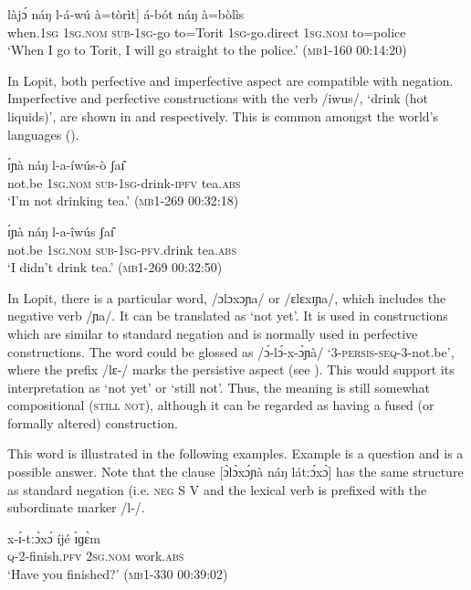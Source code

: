 \documentclass[output=paper,colorlinks,citecolor=brown,draftmode]{langscibook}
\begin{document}
\ea\label{ex:lop:4}
    \gll {\ob}làjɔ́ náŋ l-á-wú à=tòrìt] á-bót náŋ à=bòlìs \\ 
         {\db}when.1\textsc{sg} 1\textsc{sg.nom} \textsc{sub-}1\textsc{sg}{}-go to=Torit 1\textsc{sg}{}-go.direct 1\textsc{sg.nom} to=police \\
    \glt ‘When I go to Torit, I will go straight to the police.’ (\textsc{mb1-160} \textsc{00}:14:20) 
\z 

In Lopit, both perfective and imperfective aspect are compatible with negation. Imperfective and perfective constructions with the verb /iwus/, ‘drink (hot li\-quids)’, are shown in  and  respectively. This is common amongst the world’s languages (\citealt{MiestamoAuwera2011}). 

\ea\label{ex:lop:5}
        \gll ɪ́ɲà náŋ l-a-íwús-ò ʃaɪ̂    \\ 
             not.be 1\textsc{sg.nom} \textsc{sub-1sg}{}-drink-\textsc{ipfv} tea.\textsc{abs}  \\
        \glt ‘I’m not drinking tea.’  (\textsc{mb1-269} \textsc{00}:32:18)
\z

\ea\label{ex:lop:6}
        \gll ɪ́ɲà náŋ l-a-îwús ʃaɪ̂     \\ 
             not.be 1\textsc{sg.nom} \textsc{sub-1sg}{}-\textsc{pfv.}drink tea.\textsc{abs} \\
        \glt ‘I didn't drink tea.’   (\textsc{mb1-269} \textsc{00}:32:50)
\z


In Lopit, there is a particular word, /ɔlɔxɔɲa/ or /ɛlɛxɪɲa/, which includes the negative verb /ɲa/. It can be translated as ‘not yet’. It is used in constructions which are similar to standard negation and is normally used in perfective constructions. The word could be glossed as /ɔ́-lɔ́-x-ɔ̀ɲà/ ‘3-\textsc{persis}{}-\textsc{seq}{}-3-not.be’, where the prefix /lɛ-/ marks the persistive aspect (see ). This would support its interpretation as ‘not yet’ or ‘still not’. Thus, the meaning is still somewhat compositional (\textsc{still} \textsc{not}), although it can be regarded as having a fused (or formally altered) construction. 

This word is illustrated in the following examples. Example  is a question and  is a possible answer. Note that the clause [ɔ̀lɔ̀xɔ́ɲà náŋ lát:ɔ́xɔ̀] has the same structure as standard negation (i.e. \textsc{neg} S V and the lexical verb is prefixed with the subordinate marker /l-/. 

\ea\label{ex:lop:7}
        \gll x-ɪ́-tːɔ̀xɔ́  íjé ɪ̀ɡɛ̀m \\
             \textsc{q}{}-2-finish.\textsc{pfv} 2\textsc{sg.nom} work.\textsc{abs} \\
        \glt ‘Have you finished?’    (\textsc{mb1-330} \textsc{00:}39:02)
\z
\end{document}
